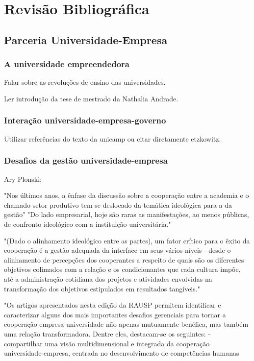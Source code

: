 \chapter[Revisão Bibliográfica]{Revisão Bibliográfica}
\label{chap:revisao}
\section{Parceria Universidade-Empresa}
\label{cha:ensino}
\subsection{A universidade empreendedora}
\label{cha:univ_empreend}

Falar sobre as revoluções de ensino das universidades.

Ler introdução da tese de mestrado da Nathalia Andrade.


\subsection{Interação universidade-empresa-governo}
\label{cha:univ_empreend}

Utilizar referências do texto da unicamp ou citar diretamente etzkowitz.

\subsection{Desafios da gestão universidade-empresa}
\label{cha:univ_empreend}

Ary Plonski:

"Nos últimos anos, a ênfase da discussão sobre a cooperação entre a academia e o chamado setor produtivo tem-se deslocado da temática ideológica para a da gestão"
"Do lado empresarial, hoje são raras as manifestações, ao menos públicas, de confronto ideológico com a instituição universitária."

"(Dado o alinhamento ideológico entre as partes), um fator crítico para o êxito da cooperação é a gestão adequada da interface em seus vários níveis - desde o alinhamento de percepções dos cooperantes a respeito de quais são os diferentes objetivos colimados com a relação e os condicionantes que cada cultura impõe, até a administração cotidiana dos projetos e atividades envolvidas na transformação dos objetivos estipulados em resultados tangíveis."

"Os artigos apresentados nesta edição da RAUSP permitem identificar e caracterizar alguns dos mais importantes desafios gerenciais para tornar a cooperação empresa-universidade não apenas mutuamente benéfica, mas também uma relação transformadora. Dentre eles, destacam-se os seguintes: 
- compartilhar uma visão multidimensional e integrada da cooperação universidade-empresa, centrada no desenvolvimento de competências humanas

